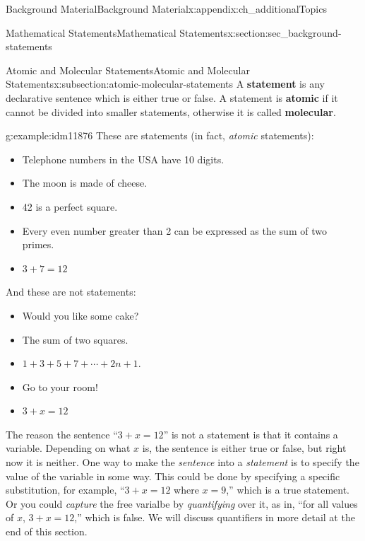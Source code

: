 \documentclass[oneside,10pt,]{book}
\newcommand{\terminology}[1]{\textbf{#1}}
\numberwithin{equation}{chapter}
\begin{document}
\begin{appendixptx}{Background Material}{}{Background Material}{}{}{x:appendix:ch_additionalTopics}
\begin{sectionptx}{Mathematical Statements}{}{Mathematical Statements}{}{}{x:section:sec_background-statements}
\begin{introduction}{}
\end{introduction}%
%
%
\typeout{************************************************}
\typeout{************************************************}
%
\begin{subsectionptx}{Atomic and Molecular Statements}{}{Atomic and Molecular Statements}{}{}{x:subsection:atomic-molecular-statements}
A \terminology{statement} is any declarative sentence which is either true or false. A statement is \terminology{atomic} if it cannot be divided into smaller statements, otherwise it is called \terminology{molecular}.%
\begin{example}{}{g:example:idm11876}%
These are statements (in fact, \emph{atomic} statements):%
\begin{itemize}[label=\textbullet]
\item{}Telephone numbers in the USA have 10 digits.%
\item{}The moon is made of cheese.%
\item{}42 is a perfect square.%
\item{}Every even number greater than 2 can be expressed as the sum of two primes.%
\item{}\(3+7 = 12\)%
\end{itemize}
And these are not statements:%
\begin{itemize}[label=\textbullet]
\item{}Would you like some cake?%
\item{}The sum of two squares.%
\item{}\(1+3+5+7+\cdots+2n+1\).%
\item{}Go to your room!%
\item{}\(3+x = 12\)%
\end{itemize}
%
\end{example}
The reason the sentence ``\(3 + x = 12\)'' is not a statement is that it contains a variable. Depending on what \(x\) is, the sentence is either true or false, but right now it is neither. One way to make the \emph{sentence} into a \emph{statement} is to specify the value of the variable in some way. This could be done by specifying a specific substitution, for example, ``\(3+x = 12\) where \(x = 9\),'' which is a true statement.  Or you could \emph{capture} the free varialbe by \emph{quantifying} over it, as in, ``for all values of \(x\), \(3+x = 12\),'' which is false. We will discuss quantifiers in more detail at the end of this section.%
\par

\end{subsectionptx}
\end{sectionptx}
\end{appendixptx}
\end{document}
